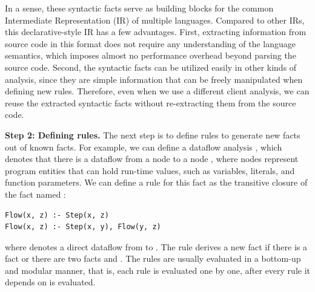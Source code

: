 In a sense, these syntactic facts serve as building blocks for the
common Intermediate Representation (IR) of multiple languages.
Compared to other IRs, this declarative-style IR has a few advantages.
First, extracting information from source code in this format does not
require any understanding of the language semantics, which imposes
almost no performance overhead beyond parsing the source code.
Second, the syntactic facts can be utilized easily in other kinds of
analysis, since they are simple information that can be freely
manipulated when defining new rules. Therefore, even when we use a different
client analysis, we can reuse the extracted syntactic facts
without re-extracting them from the source code.

\smallskip
\textbf{Step 2: Defining rules.}
The next step is to define rules to generate new facts out of known facts.
 For example, we can define a dataflow
analysis ,  which denotes that there is a dataflow from a node 
to a node , where nodes represent program entities that can hold
run-time values, such as variables, literals, and function parameters.  We
can define a rule for this fact as the transitive closure of the fact named
:

\begin{lstlisting}[style=mrule]
Flow(x, z) :- Step(x, z)
Flow(x, z) :- Step(x, y), Flow(y, z)
\end{lstlisting}

\noindent
where  denotes a direct dataflow from  to . The
rule derives a new fact  if there is a fact  or
there are two facts  and .
The rules are usually
evaluated in a bottom-up and modular manner, that is, each rule is evaluated
one by one, after every rule it depends on is evaluated.


